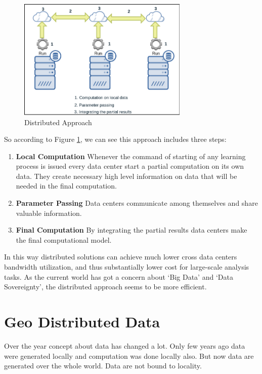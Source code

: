 \documentclass[12pt,notitlepage,oneside]{report}
\begin{document}
\begin{figure}[!htbp]
  \centering
	\includegraphics[width=3.2in]{figures/2.png}
	\caption{Distributed Approach}
\label{distributed}
\end{figure}

So according to Figure \ref{distributed}, we can see this approach includes three steps:

\begin{enumerate}
\item \textbf{Local Computation} Whenever the command of starting of any learning process is issued every data center start a partial computation on its own data. They create necessary high level information on data that will be needed in the final computation.

\item \textbf{Parameter Passing} Data centers communicate among themselves and share valuable information.

\item \textbf{Final Computation} By integrating the partial results data centers make the final computational model.
\end{enumerate}

In this way distributed solutions can achieve much lower cross data centers bandwidth utilization, and thus substantially lower cost for large-scale analysis tasks. As the current world has got a concern about `Big Data' and `Data Sovereignty', the distributed approach seems to be more efficient. 


\section{Geo Distributed Data}

Over the year concept about data has changed a lot. Only few years ago data were generated locally and computation was done locally also. But now data are generated over the whole world. Data are not bound to locality. 
\end{document}
